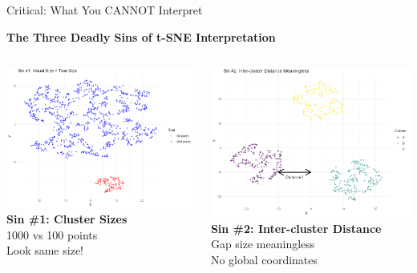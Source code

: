 \documentclass[aspectratio=169]{beamer}
\begin{document}
\begin{frame}{Critical: What You CANNOT Interpret}
\begin{center}
\colorbox{red!30}{\Large\textbf{The Three Deadly Sins of t-SNE Interpretation}}
\end{center}

\begin{columns}
\includegraphics[width=\textwidth]{./Figures/sin1_cluster_size.png}
\textbf{Sin \#1: Cluster Sizes}\\
1000 vs 100 points\\
Look same size!

\includegraphics[width=\textwidth]{./Figures/sin2_distances.png}
\textbf{Sin \#2: Inter-cluster Distance}\\
Gap size meaningless\\
No global coordinates


\end{columns}
\end{frame}
\end{document}
